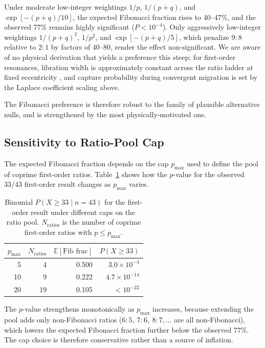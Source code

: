 \documentclass[twocolumn,11pt]{article}
\begin{document}
Under moderate low-integer weightings $1/p$, $1/(p+q)$, and
$\exp[-(p+q)/10]$, the expected Fibonacci fraction rises to
40--47\%, and the observed 77\% remains highly significant
($P < 10^{-4}$). Only aggressively low-integer weightings
$1/(p+q)^2$, $1/p^2$, and $\exp[-(p+q)/5]$, which penalize $9\!:\!8$
relative to $2\!:\!1$ by factors of 40--80, render the effect
non-significant. We are aware of no physical derivation that yields a
preference this steep; for first-order resonances, libration width is
approximately constant across the ratio ladder at fixed eccentricity
\citep{murray1999}, and capture probability during convergent
migration is set by the Laplace coefficient scaling above.

The Fibonacci preference is therefore robust to the family of
plausible alternative nulls, and is strengthened by the most
physically-motivated one.

\subsection{Sensitivity to Ratio-Pool Cap}
\label{sec:cap_sensitivity}

The expected Fibonacci fraction depends on the cap $p_{\max}$ used
to define the pool of coprime first-order ratios.
Table~\ref{tab:cap_sensitivity} shows how the $p$-value for the
observed $33/43$ first-order result changes as $p_{\max}$ varies.

\begin{table}[ht]
\centering
\small
\caption{Binomial $P(X \geq 33 \mid n = 43)$ for the first-order
result under different caps on the ratio pool.  $N_{\mathrm{ratios}}$
is the number of coprime first-order ratios with $p \leq p_{\max}$.}
\label{tab:cap_sensitivity}
\begin{tabular}{rrrr}
\toprule
$p_{\max}$ & $N_{\mathrm{ratios}}$ & $\mathbb{E}[\text{Fib frac}]$ & $P(X \geq 33)$ \\
\midrule
 5 &  4 & 0.500 & $3.0 \times 10^{-4}$ \\
10 &  9 & 0.222 & $4.7 \times 10^{-14}$ \\
20 & 19 & 0.105 & $< 10^{-22}$ \\
\bottomrule
\end{tabular}
\end{table}

The $p$-value strengthens monotonically as $p_{\max}$ increases,
because extending the pool adds only non-Fibonacci ratios
($6\!:\!5,\ 7\!:\!6,\ 8\!:\!7,\ldots$ are all non-Fibonacci),
which lowers the expected Fibonacci fraction further below the
observed 77\%.  The cap choice is therefore conservative rather
than a source of inflation.
\end{document}

